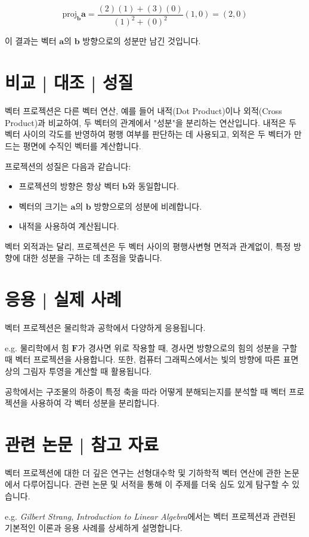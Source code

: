 \documentclass[12pt]{article}
\begin{document}
\[
  \text{proj}_{\mathbf{b}} \mathbf{a} = \frac{(2)(1) + (3)(0)}{(1)^2 + (0)^2}(1, 0) = (2, 0)
\]

\noindent 이 결과는 벡터 \( \mathbf{a} \)의 \( \mathbf{b} \) 방향으로의 성분만 남긴 것입니다.

\section{비교 | 대조 | 성질}
\noindent 벡터 프로젝션은 다른 벡터 연산, 예를 들어 내적(Dot Product)이나 외적(Cross Product)과 비교하여, 두 벡터의 관계에서 "성분"을 분리하는 연산입니다. 내적은 두 벡터 사이의 각도를 반영하여 평행 여부를 판단하는 데 사용되고, 외적은 두 벡터가 만드는 평면에 수직인 벡터를 계산합니다.

\noindent 프로젝션의 성질은 다음과 같습니다:
\begin{itemize}
  \item 프로젝션의 방향은 항상 벡터 \( \mathbf{b} \)와 동일합니다.
  \item 벡터의 크기는 \( \mathbf{a} \)의 \( \mathbf{b} \) 방향으로의 성분에 비례합니다.
  \item 내적을 사용하여 계산됩니다.
\end{itemize}

\noindent 벡터 외적과는 달리, 프로젝션은 두 벡터 사이의 평행사변형 면적과 관계없이, 특정 방향에 대한 성분을 구하는 데 초점을 맞춥니다.

\section{응용 | 실제 사례}
\noindent 벡터 프로젝션은 물리학과 공학에서 다양하게 응용됩니다.

\vspace{1\baselineskip}
\noindent {} e.g. 물리학에서 힘 \( \mathbf{F} \)가 경사면 위로 작용할 때, 경사면 방향으로의 힘의 성분을 구할 때 벡터 프로젝션을 사용합니다. 또한, 컴퓨터 그래픽스에서는 빛의 방향에 따른 표면상의 그림자 투영을 계산할 때 활용됩니다.

\noindent 공학에서는 구조물의 하중이 특정 축을 따라 어떻게 분해되는지를 분석할 때 벡터 프로젝션을 사용하여 각 벡터 성분을 분리합니다.

\section{관련 논문 | 참고 자료}
\noindent 벡터 프로젝션에 대한 더 깊은 연구는 선형대수학 및 기하학적 벡터 연산에 관한 논문에서 다루어집니다. 관련 논문 및 서적을 통해 이 주제를 더욱 심도 있게 탐구할 수 있습니다.

\vspace{1\baselineskip}
\noindent {} e.g. \textit{Gilbert Strang}, \textit{Introduction to Linear Algebra}에서는 벡터 프로젝션과 관련된 기본적인 이론과 응용 사례를 상세하게 설명합니다.
\end{document}
